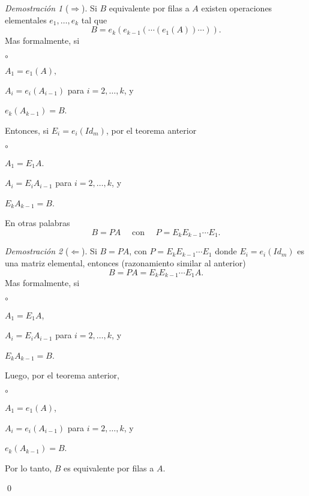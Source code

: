 \documentclass{article}
\theoremstyle{definition}
\theoremstyle{definition}
\theoremstyle{remark}
\newtheorem*{demo}{Demostración}
\begin{document}
 \begin{demo}[$\Rightarrow$]
   Si $B$ equivalente por filas a $A$ existen operaciones elementales $e_1,\dots,e_k$ tal que \[
     B=e_{k}(e_{k-1}(\cdots (e_1(A))\cdots)).
   \]
   Mas formalmente, si 
\begin{list}{$\circ$}{}  
\item $A_1=e_1(A),$ 
\item $A_i=e_i(A_{i-1})$ para $i=2, \dots,k$, y 
\item $e_k(A_{k-1})=B$.
\end{list}
Entonces, si $E_i=e_i(Id_m)$, por el teorema anterior\begin{list}{$\circ$}{}  
\item  $A_1=E_1A$. 
\item $A_i=E_iA_{i-1}$ para $i=2,\dots,k$, y 
\item $E_kA_{k-1}=B$.
\end{list}
En otras palabras \[
  B=PA \quad \text{ con } \quad P=E_{k}E_{k-1}\cdots E_{1}.
\]
 \end{demo}
\begin{demo}[$\Leftarrow$]
  Si $B=PA$, con $P=E_{k}E_{k-1}\cdots E_{1}$ donde $E_{i}=e_{i}(Id_m)$ es una matriz elemental, entonces (razonamiento similar al anterior) \[
    B=PA=E_{k}E_{k-1}\cdots E_{1}A.
  \] 
  Mas formalmente, si 
\begin{list}{$\circ$}{}  
\item $A_1=E_1A$, 
\item $A_{i}=E_iA_{i-1}$ para $i=2,\dots,k$, y 
\item $E_kA_{k-1}=B$.
\end{list}
Luego, por el teorema anterior, 
\begin{list}{$\circ$}{}  
\item $A_1=e_1(A)$, 
\item $A_i = e_i(A_{i-1})$ para $i=2,\dots,k$, y
\item $e_{k}(A_{k-1})=B$.
\end{list}
Por lo tanto, $B$ es equivalente por filas a $A$.
\end{demo}
\qed
\pagebreak
\end{document}
